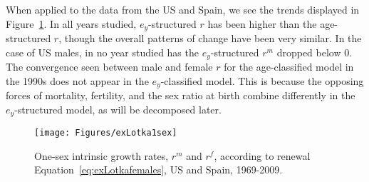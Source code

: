   \FloatBarrier
  \label{sec:trendsinrex1sex}
 When applied to the data from the US and Spain, we see the trends
displayed in Figure~\ref{fig:rex1sex}. In all years studied, $e_y$-structured
$r$ has been higher than the age-structured $r$, though the overall patterns of
change have been very similar. In the case of US males, in no year studied
has the $e_y$-structured $r^m$ dropped below 0. The convergence seen between
male and female $r$ for the age-classified model in the 1990s does not appear in
the $e_y$-classified model. This is because the opposing forces of mortality,
fertility, and the sex ratio at birth combine differently in the
$e_y$-structured model, as will be decomposed later.

\begin{figure}[!ht]
  \centering
    \caption{One-sex intrinsic growth rates, $r^m$ and $r^f$, according to
    renewal Equation~\eqref{eq:exLotkafemales}, US and Spain, 1969-2009.}
     \texttt{[image: Figures/exLotka1sex]}
     \label{fig:rex1sex}
\end{figure}
 \FloatBarrier
